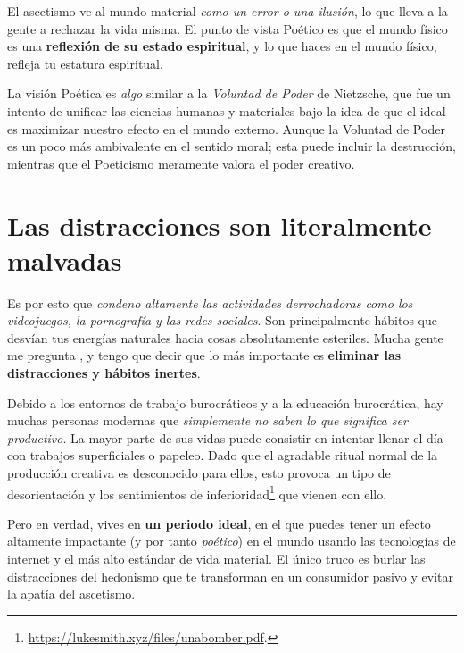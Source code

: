 \documentclass{article}
\begin{document}
	El ascetismo ve al mundo material \textit{como un error o una ilusión},
	lo que lleva a la gente a rechazar la vida misma. El punto de vista
	Poético es que el mundo físico es una \textbf{reflexión de su estado
	espiritual}, y lo que haces en el mundo físico, refleja tu estatura
	espiritual.

	La visión Poética es \textit{algo} similar a la \textit{Voluntad de
	Poder} de Nietzsche, que fue un intento de unificar las ciencias humanas
	y materiales bajo la idea de que el ideal es maximizar nuestro efecto en
	el mundo externo. Aunque la Voluntad de Poder es un poco más ambivalente
	en el sentido moral; esta puede incluir la destrucción, mientras que el
	Poeticismo meramente valora el poder creativo.

	\section*{Las distracciones son literalmente malvadas}

	Es por esto que \textit{condeno altamente las actividades derrochadoras como
	los videojuegos, la pornografía y las redes sociales}. Son
	principalmente hábitos que desvían tus energías naturales hacia cosas
	absolutamente esteriles. Mucha gente me pregunta , y tengo que decir que lo más importante
	es \textbf{eliminar las distracciones y hábitos inertes}.

	Debido a los entornos de trabajo burocráticos y a la educación
	burocrática, hay muchas personas modernas que \textit{simplemente no
	saben lo que significa ser productivo}. La mayor parte de sus vidas
	puede consistir en intentar llenar el día con trabajos superficiales
	o papeleo. Dado que el agradable ritual normal de la producción creativa
	es desconocido para ellos, esto provoca un tipo de desorientación y los
	sentimientos de
	inferioridad\footnote{\url{https://lukesmith.xyz/files/unabomber.pdf}.}
	\cite{tres} que vienen con ello.

	Pero en verdad, vives en \textbf{un periodo ideal}, en el que puedes
	tener un efecto altamente impactante (y por tanto \textit{poético}) en
	el mundo usando las tecnologías de internet y el más alto estándar de
	vida material. El único truco es burlar las distracciones del hedonismo
	que te transforman en un consumidor pasivo y evitar la apatía del
	ascetismo.

	\newpage

	\renewcommand\refname{\large{Notas del traductor}}
\end{document}

